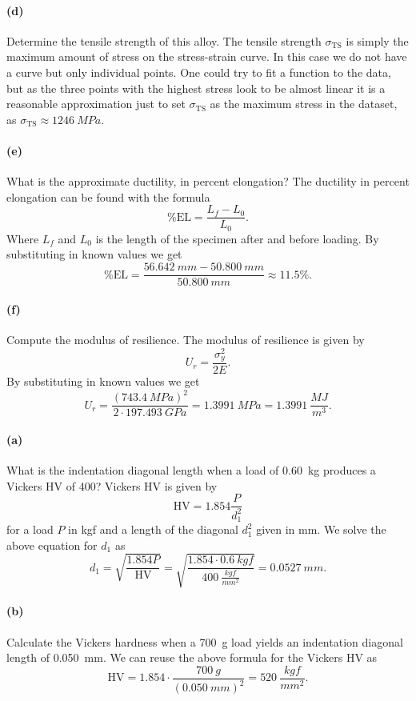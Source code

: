 \paragraph{(d)} Determine the tensile strength of this alloy.
\bigbreak
The tensile strength $\sigma_{\mathrm{TS}}$ is simply the maximum amount of stress on the stress-strain curve. In this case we do not have a curve but only individual points. One could try to fit a function to the data, but as the three points with the highest stress look to be almost linear it is a reasonable approximation just to set $\sigma_{\mathrm{TS}}$ as the maximum stress in the dataset, as $\sigma_{\mathrm{TS}} \approx \qty{1246}{MPa}$.

\paragraph{(e)} What is the approximate ductility, in percent elongation?
\bigbreak
The ductility in percent elongation can be found with the formula
\[ 
  \% \mathrm{EL} = \frac{L_f - L_0}{L_0}
.\]
Where $L_f$ and $L_0$ is the length of the specimen after and before loading. By substituting in known values we get
\[ 
\% \mathrm{EL} = \frac{\qty{56,642}{mm} - \qty{50,800}{mm}}{\qty{50,800}{mm}} \approx \num{11,5} \% 
.\]


\paragraph{(f)} Compute the modulus of resilience.
\bigbreak
The modulus of resilience is given by
\[ 
U_r = \frac{\sigma_y^2}{2E}
.\]
By substituting in known values we get
\[ 
U_r = \frac{(\qty{743,4}{MPa})^2}{2\cdot \qty{197,493}{GPa}} = \qty{1,3991}{MPa} = \qty{1,3991}{\frac{MJ}{m^3}} 
.\]



\paragraph{(a)} What is the indentation diagonal length when a load of \qty{0,60}{kg} produces a Vickers $\mathrm{HV}$ of \num{400}?
\bigbreak
Vickers $\mathrm{HV}$ is given by
\[ 
\mathrm{HV} = \num{1,854} \frac{P}{d_1^2}
\]
for a load $P$ in \unit{kgf} and a length of the diagonal $d_1^2$ given in \unit{mm}. We solve the above equation for $d_1$ as
\[ 
d_1 = \sqrt{\frac{\num{1,854} P}{\mathrm{HV}}} = \sqrt{\frac{\num{1,854} \cdot \qty{0,6}{kgf}}{\qty{400}{\frac{kgf}{mm^2}}}} = \qty{0,0527}{mm}
.\]


\paragraph{(b)} Calculate the Vickers hardness when a \qty{700}{g} load yields an indentation diagonal length of \qty{0,050}{mm}.
\bigbreak
We can reuse the above formula for the Vickers $\mathrm{HV}$ as
\[ 
\mathrm{HV} = \num{1,854} \cdot \frac{\qty{700}{g}}{(\qty{0,050}{mm})^2} = \qty{520}{\frac{kgf}{mm^2}} 
.\]

